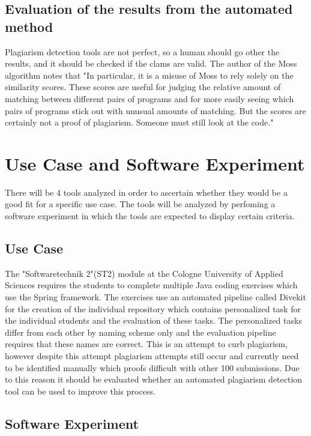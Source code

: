 \documentclass[a4paper, 11pt]{article}
\renewcommand{\\}{\vspace*{0.5\baselineskip} \newline}
\begin{document}
\subsection{Evaluation of the results from the automated method}

Plagiarism detection tools are not perfect, so a human should go other the results, and it should be checked if the clams are valid. The author of the Moss algorithm \autocite{SMOSS} notes that "In particular, it is a misuse of Moss to rely solely on the similarity scores. These scores are useful for judging the relative amount of matching between different pairs of programs and for more easily seeing which pairs of programs stick out with unusual amounts of matching. But the scores are certainly not a proof of plagiarism. Someone must still look at the code."

\clearpage

\section{Use Case and Software Experiment}

There will be 4 tools analyzed in order to ascertain whether they would be a good fit for a specific use case. The tools will be analyzed by perfoming
a software experiment in which the tools are expected to display certain criteria.

\subsection{Use Case}

The "Softwaretechnik 2"(ST2) module at the Cologne University of Applied Sciences requires the students to complete multiple Java coding exercises which
use the Spring framework. The exercises use an automated pipeline called Divekit for the creation of the individual repository which contains personalized task for the
individual students and the evaluation of these tasks. The personalized tasks differ from each other by naming scheme only and the evaluation pipeline
requires that these names are correct. This is an attempt to curb plagiarism, however despite this attempt plagiarism attempts still occur and currently
need to be identified manually which proofs difficult with other 100 submissions. Due to this reason it should be evaluated whether an automated plagiarism
detection tool can be used to improve this process.

\subsection{Software Experiment}
\end{document}
